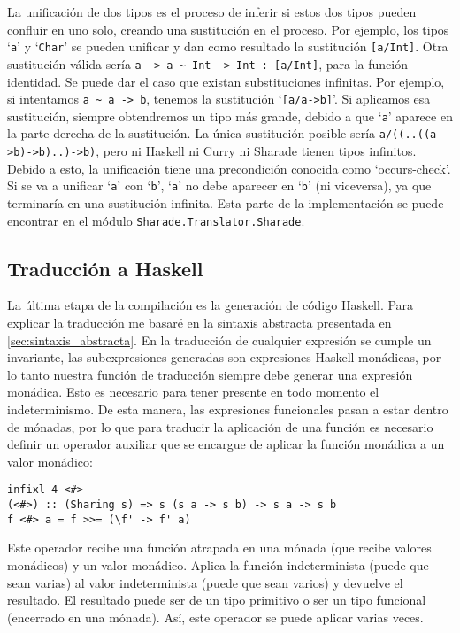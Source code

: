 \documentclass[class=article, crop=false]{standalone}
\begin{document}
La unificación de dos tipos es el proceso de inferir si estos dos tipos pueden confluir en
uno solo, creando una sustitución en el proceso. Por ejemplo, los tipos `\verb`a`' y
`\verb`Char`' se pueden unificar y dan como resultado la sustitución \verb`[a/Int]`. Otra
sustitución válida sería \verb`a -> a ~ Int -> Int : [a/Int]`, para la función identidad. Se
puede dar el caso que existan substituciones infinitas. Por ejemplo, si intentamos
\verb`a ~ a -> b`, tenemos la sustitución `\verb`[a/a->b]`'. Si aplicamos esa sustitución,
siempre obtendremos un tipo más grande, debido a que `\verb`a`' aparece en la parte derecha
de la sustitución. La única sustitución posible sería \verb`a/((..((a->b)->b)..)->b)`, pero
ni Haskell ni Curry ni Sharade tienen tipos infinitos. Debido a esto, la unificación tiene
una precondición conocida como `occurs-check'. Si se va a unificar `\verb`a`' con `\verb`b`',
`\verb`a`' no debe aparecer en `\verb`b`' (ni viceversa), ya que terminaría en una
sustitución infinita. Esta parte de la implementación se puede encontrar en el módulo
\verb`Sharade.Translator.Sharade`.

\subsection{Traducción a Haskell}\label{sec:traduccion}

La última etapa de la compilación es la generación de código Haskell. Para explicar la
traducción me basaré en la sintaxis abstracta presentada en \ref{sec:sintaxis_abstracta}. En
la traducción de cualquier expresión se cumple un invariante, las subexpresiones generadas
son expresiones Haskell monádicas, por lo tanto nuestra función de traducción siempre debe
generar una expresión monádica. Esto es necesario para tener presente en todo momento el
indeterminismo. De esta manera, las expresiones funcionales pasan a estar dentro de mónadas,
por lo que para traducir la aplicación de una función es necesario definir un operador
auxiliar que se encargue de aplicar la función monádica a un valor monádico:

\begin{verbatim}
infixl 4 <#>
(<#>) :: (Sharing s) => s (s a -> s b) -> s a -> s b
f <#> a = f >>= (\f' -> f' a)
\end{verbatim}

Este operador recibe una función atrapada en una mónada (que recibe valores monádicos) y un
valor monádico. Aplica la función indeterminista (puede que sean varias) al valor
indeterminista (puede que sean varios) y devuelve el resultado. El resultado puede ser de un
tipo primitivo o ser un tipo funcional (encerrado en una mónada). Así, este operador se puede
aplicar varias veces.
\end{document}
